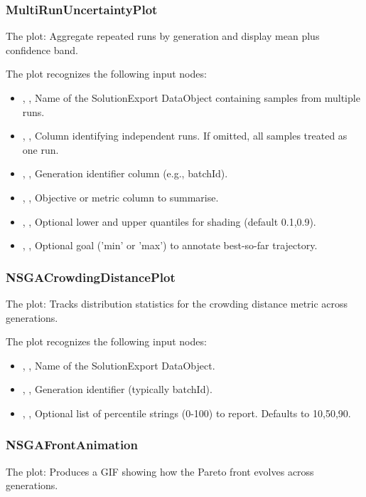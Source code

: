 \subsubsection{MultiRunUncertaintyPlot}
The   plot: Aggregate repeated runs by generation and display mean plus confidence band.

The  plot recognizes the following input nodes:
\begin{itemize}
  \item {}, , Name of the SolutionExport DataObject containing samples from multiple runs.
  \item {}, , Column identifying independent runs. If omitted, all samples treated as one run.
  \item {}, , Generation identifier column (e.g., batchId).
  \item {}, , Objective or metric column to summarise.
  \item {}, , Optional lower and upper quantiles for shading (default 0.1,0.9).
  \item {}, , Optional goal ('min' or 'max') to annotate best-so-far trajectory.
\end{itemize}

\subsubsection{NSGACrowdingDistancePlot}
The   plot: Tracks distribution statistics for the crowding distance metric across generations.

The  plot recognizes the following input nodes:
\begin{itemize}
  \item {}, , Name of the SolutionExport DataObject.
  \item {}, , Generation identifier (typically batchId).
  \item {}, , Optional list of percentile strings (0-100) to report. Defaults to 10,50,90.
\end{itemize}

\subsubsection{NSGAFrontAnimation}
The   plot: Produces a GIF showing how the Pareto front evolves across generations.

